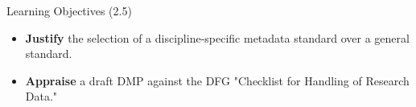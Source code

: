 \begin{frame}{Learning Objectives (2.5)}
    \begin{itemize}
        \item \textbf{Justify} the selection of a discipline-specific metadata standard over a general standard.
        \item \textbf{Appraise} a draft DMP against the DFG "Checklist for Handling of Research Data."
    \end{itemize}
\end{frame}

%         

